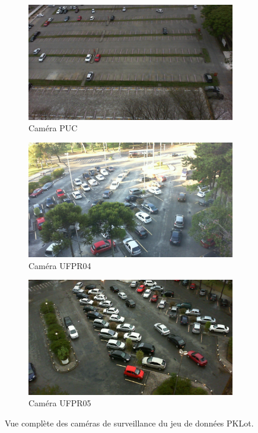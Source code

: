 \documentclass[12pt]{article}
\begin{document}
\begin{figure}[htbp]
    \centering
    \begin{subfigure}{0.7\textwidth}
        \centering
        \includegraphics[width=\textwidth]{figures/datasets/2012-09-12_07_02_42.jpg}
        \caption{Caméra PUC}
    \end{subfigure}
    \begin{subfigure}{0.45\textwidth}
        \centering
        \includegraphics[width=\textwidth]{figures/datasets/2013-01-29_20_21_23.jpg}
        \caption{Caméra UFPR04}
    \end{subfigure}
    \begin{subfigure}{0.45\textwidth}
        \centering
        \includegraphics[width=\textwidth]{figures/datasets/2013-04-12_16_20_11.jpg}
        \caption{Caméra UFPR05}
    \end{subfigure}
    \caption{Vue complète des caméras de surveillance du jeu de données PKLot.}
    \label{fig:pklot_video_feed}
\end{figure}
\end{document}
